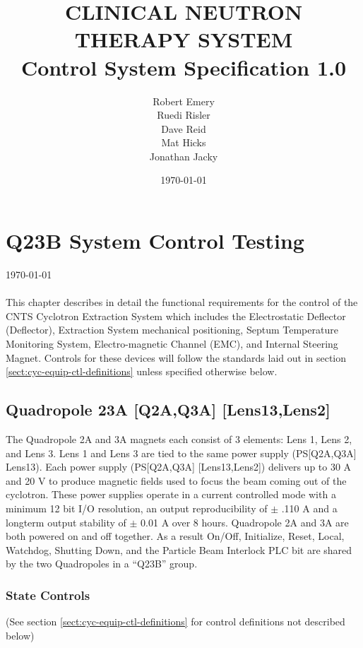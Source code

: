 \documentclass[11pt]{book}		%
\title{CLINICAL NEUTRON THERAPY SYSTEM\\
	Control System Specification 1.0\\[1.0cm]}
\author{Robert Emery\\
	Ruedi Risler\\
	Dave Reid \\
	Mat Hicks \\
        Jonathan Jacky}
\date{\today}
\begin{document}
\chapter{Q23B System Control Testing} \label{ch:cyc-equip-ctl-beamline}

\vspace*{-.75in}
\today \\
\vspace*{.75in}
\\

This chapter describes in detail the functional requirements for the control of the CNTS Cyclotron Extraction System which includes the Electrostatic Deflector (Deflector), Extraction System mechanical positioning, Septum Temperature Monitoring System, Electro-magnetic Channel (EMC), and Internal Steering Magnet.  Controls for these devices will follow the standards laid out in section \ref{sect:cyc-equip-ctl-definitions} unless specified otherwise below.

\section{Quadropole 23A [Q2A,Q3A] [Lens13,Lens2]} \label{sect:cyc-equip-ctl-beamline-quad23b}

The Quadropole 2A and 3A magnets each consist of 3 elements: Lens 1, Lens 2, and Lens 3. Lens 1 and Lens 3 are tied to the same power supply (PS[Q2A,Q3A] Lens13). Each power supply (PS[Q2A,Q3A] [Lens13,Lens2]) delivers up to 30 A and 20 V to produce magnetic fields used to focus the beam coming out of the cyclotron.  These power supplies operate in a current controlled mode with a minimum 12 bit I/O resolution, an output reproducibility of $\pm$ .110 A and a longterm output stability of $\pm$ 0.01 A over 8 hours. Quadropole 2A and 3A are both powered on and off together. As a result On/Off, Initialize, Reset, Local, Watchdog, Shutting Down, and the Particle Beam Interlock PLC bit are shared by the two Quadropoles in a ``Q23B'' group.

\subsection{State Controls} \label{sect:cyc-equip-ctl-beamline-Q23B-state-controls}
(See section \ref{sect:cyc-equip-ctl-definitions} for control definitions not described below)
\end{document}
